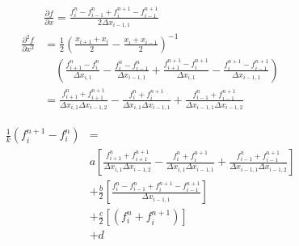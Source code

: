 \documentclass{article}
\begin{document}
    \begin{equation}
        \begin{split}
            & \frac{\partial f}{\partial x} =
            \frac{f_{i}^n -f_{i-1}^n + f_{i}^{n+1} -f_{i-1}^{n+1} }
                {2 \Delta x_{i-1,1}}
            \\
            \frac{\partial^2 f}{\partial x^2} &=
            \frac{1}{2}\left(\frac{x_{i+1}+x_i}{2} - \frac{x_i+x_{i-1}}{2}\right)^{-1}
            \\
            & \quad \left(
            \frac{f_{i+1}^n-f_{i}^n}{\Delta x_{i,1}}
            -\frac{f_{i}^n-f_{i-1}^n}{\Delta x_{i-1,1}}
            +\frac{f_{i+1}^{n+1}-f_{i}^{n+1}}{\Delta x_{i,1}}
            -\frac{f_{i}^{n+1}-f_{i-1}^{n+1}}{\Delta x_{i-1,1}}
            \right)
            \\
            &=\frac{f_{i+1}^n + f_{i+1}^{n+1}}
                {\Delta x_{i,1} \Delta x_{i-1,2}}
            - \frac{f_i^n + f_i^{n+1}}
                {\Delta x_{i,1} \Delta x_{i-1,1}}
            + \frac{f_{i-1}^n + f_{i-1}^{n+1}}
                {\Delta x_{i-1,1} \Delta x_{i-1,2}}
        \end{split}
    \end{equation}

    \begin{equation}
        \begin{split}
            \frac{1}{k}\left(f_i^{n+1} - f_i^n\right) &=
            \\
            & a\left[
                \frac{f_{i+1}^n + f_{i+1}^{n+1}}
                {\Delta x_{i,1} \Delta x_{i-1,2}}
                - \frac{f_i^n + f_i^{n+1}}
                {\Delta x_{i,1} \Delta x_{i-1,1}}
                + \frac{f_{i-1}^n + f_{i-1}^{n+1}}
                    {\Delta x_{i-1,1} \Delta x_{i-1,2}}
                     \right]
            \\
                 & + \frac{b}{2} \left[ 
                        \frac{f_{i}^n -f_{i-1}^n+f_{i}^{n+1}-f_{i-1}^{n+1}}
                            {\Delta x_{i-1,1}}
                     \right]
            \\
            & + \frac{c}{2} \left[
                    \left( f_i^n + f_i^{n+1} \right)
                     \right]
            \\
            & + d
        \end{split}
    \end{equation}
\end{document}
